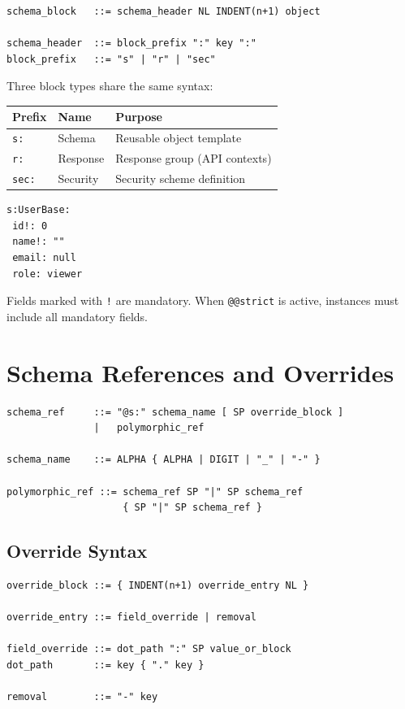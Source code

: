 \documentclass[11pt, a4paper]{article}
\begin{document}
\begin{lstlisting}[style=ebnf]
schema_block   ::= schema_header NL INDENT(n+1) object

schema_header  ::= block_prefix ":" key ":"
block_prefix   ::= "s" | "r" | "sec"
\end{lstlisting}

\noindent Three block types share the same syntax:

\begin{tabular}{lll}
\toprule
Prefix & Name & Purpose \\
\midrule
\texttt{s:} & Schema & Reusable object template \\
\texttt{r:} & Response & Response group (API contexts) \\
\texttt{sec:} & Security & Security scheme definition \\
\bottomrule
\end{tabular}

\begin{lstlisting}[style=scon]
s:UserBase:
 id!: 0
 name!: ""
 email: null
 role: viewer
\end{lstlisting}

\noindent Fields marked with \texttt{!} are mandatory. When \texttt{@@strict} is
active, instances must include all mandatory fields.

\section{Schema References and Overrides}
\label{sec:schema-refs}

\begin{lstlisting}[style=ebnf]
schema_ref     ::= "@s:" schema_name [ SP override_block ]
               |   polymorphic_ref

schema_name    ::= ALPHA { ALPHA | DIGIT | "_" | "-" }

polymorphic_ref ::= schema_ref SP "|" SP schema_ref
                    { SP "|" SP schema_ref }
\end{lstlisting}

\subsection{Override Syntax}
\label{sec:overrides}

\begin{lstlisting}[style=ebnf]
override_block ::= { INDENT(n+1) override_entry NL }

override_entry ::= field_override | removal

field_override ::= dot_path ":" SP value_or_block
dot_path       ::= key { "." key }

removal        ::= "-" key
\end{lstlisting}
\end{document}
